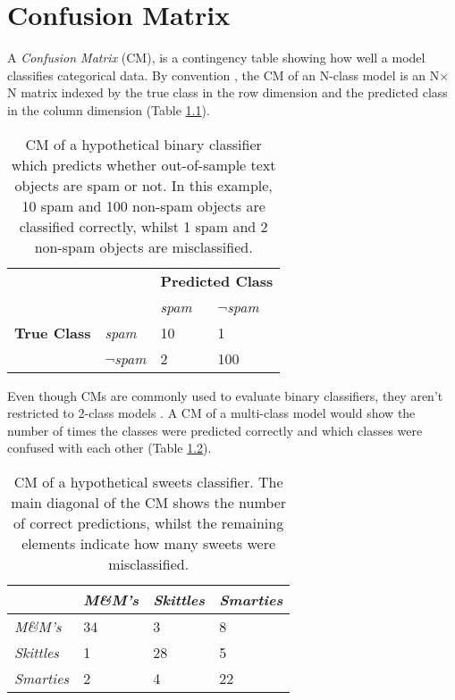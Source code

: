 \chapter{Confusion Matrix}
\label{ch:confusion-matrix}

A \textit{Confusion Matrix} (CM), is a contingency table showing how well a model classifies categorical data. By convention \citep{sammut2017encyclopedia}, the CM of an N-class model is an N$\times$N matrix indexed by the true class in the row dimension and the predicted class in the column dimension (Table \ref{tab:cm_spam}).


\begin{table}[ht]
  \centering
  \selectfont
  \begin{tabular}{llll}
    \toprule
                        &                     & \multicolumn{2}{c}{\textbf{Predicted Class}} \\
                        &                     & \textit{spam} & \textit{$\neg$spam} \\
    \midrule
    \textbf{True Class} & \textit{spam}       & 10           & 1 \\
                        & \textit{$\neg$spam} & 2            & 100 \\
    \bottomrule
  \end{tabular}
  \caption{CM of a hypothetical binary classifier which predicts whether out-of-sample text objects are spam or not. In this example, 10 spam and 100 non-spam objects are classified correctly, whilst 1 spam and 2 non-spam objects are misclassified.}
  \label{tab:cm_spam}
\end{table}

Even though CMs are commonly used to evaluate binary classifiers, they aren't restricted to 2-class models \citep{martin2018speech}. A CM of a multi-class model would show the number of times the classes were predicted correctly and which classes were confused with each other (Table \ref{tab:cm_sweets}).

\begin{table}[ht]
  \centering
  \selectfont
  \begin{tabular}{llll}
    \toprule
                      & \textit{M\&M's} & \textit{Skittles} & \textit{Smarties} \\
    \midrule
    \textit{M\&M's}   & 34              & 3                 & 8  \\
    \textit{Skittles} & 1               & 28                & 5  \\
    \textit{Smarties} & 2               & 4                 & 22 \\
    \bottomrule
  \end{tabular}
  \caption{CM of a hypothetical sweets classifier. The main diagonal of the CM shows the number of correct predictions, whilst the remaining elements indicate how many sweets were misclassified.}
  \label{tab:cm_sweets}
\end{table}

